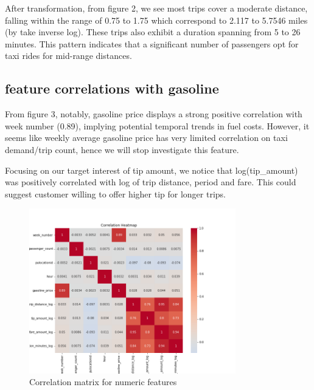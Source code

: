 \documentclass[11pt]{article}
\begin{document}
After transformation, from figure 2, we see most trips cover a moderate distance, falling within the range of 0.75 to 1.75 which correspond to 2.117 to 5.7546 miles (by take inverse log). These trips also exhibit a duration spanning from 5 to 26 minutes. This pattern indicates that a significant number of passengers opt for taxi rides for mid-range distances.


\subsection{feature correlations with gasoline}
From figure 3, notably, gasoline price displays a strong positive correlation with week number (0.89), implying potential temporal trends in fuel costs. However, it seems like weekly average gasoline price has very limited correlation on taxi demand/trip count, hence we will stop investigate this feature. 

Focusing on our target interest of tip amount, we notice that log(tip\_amount) was positively correlated with log of trip distance, period and fare. This could suggest customer willing to offer higher tip for longer trips. 
\begin{figure}[h]
    \includegraphics[width=0.80\textwidth]{plots/correlation_heatmap.png}
    \centering
    \caption{Correlation matrix for numeric features} %
\end{figure}
\end{document}
